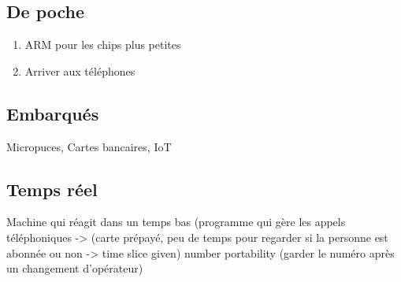 \subsection{De poche}
\begin{enumerate}
  \item ARM pour les chips plus petites
  \item Arriver aux téléphones
\end{enumerate}

\subsection{Embarqués}
Micropuces, Cartes bancaires, IoT

\subsection{Temps réel}
Machine qui réagit dans un temps bas (programme qui gère les appels téléphoniques -> (carte prépayé, peu de temps pour regarder si la personne est abonnée ou non -> time slice given) number portability (garder le numéro après un changement d'opérateur)
